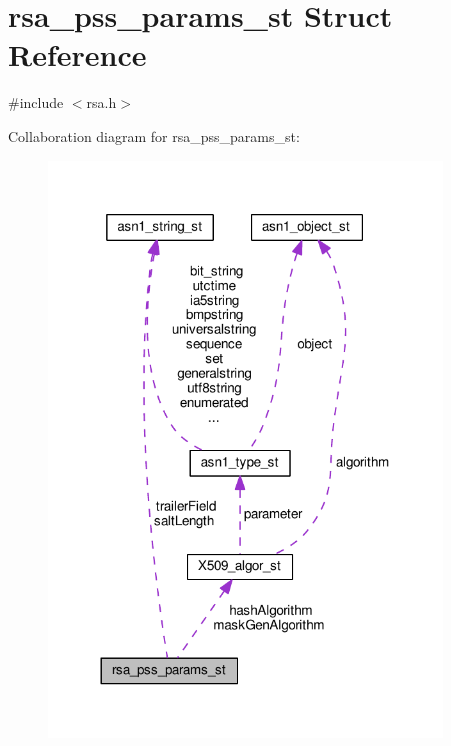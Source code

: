 \hypertarget{structrsa__pss__params__st}{}\section{rsa\+\_\+pss\+\_\+params\+\_\+st Struct Reference}
\label{structrsa__pss__params__st}


{\ttfamily \#include $<$rsa.\+h$>$}



Collaboration diagram for rsa\+\_\+pss\+\_\+params\+\_\+st\+:
\nopagebreak
\begin{figure}[H]
\begin{center}
\leavevmode
\includegraphics[width=296pt]{structrsa__pss__params__st__coll__graph}
\end{center}
\end{figure}
